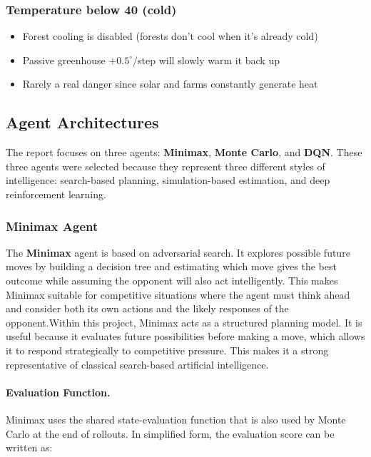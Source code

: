 \documentclass[12pt,a4paper]{article}
\begin{document}
\subsubsection*{Temperature below 40 (cold)}
\begin{itemize}[leftmargin=1.5cm]
    \item Forest cooling is disabled (forests don't cool when it's already cold)
    \item Passive greenhouse $+0.5^\circ$/step will slowly warm it back up
    \item Rarely a real danger since solar and farms constantly generate heat
\end{itemize}

\subsection{Agent Architectures}

The report focuses on three agents: \textbf{Minimax}, \textbf{Monte Carlo}, and \textbf{DQN}. These three agents were selected because they represent three different styles of intelligence: search-based planning, simulation-based estimation, and deep reinforcement learning.

\subsubsection{Minimax Agent}

The \textbf{Minimax} agent is based on adversarial search. It explores possible future moves by building a decision tree and estimating which move gives the best outcome while assuming the opponent will also act intelligently. This makes Minimax suitable for competitive situations where the agent must think ahead and consider both its own actions and the likely responses of the opponent.Within this project, Minimax acts as a structured planning model. It is useful because it evaluates future possibilities before making a move, which allows it to respond strategically to competitive pressure. This makes it a strong representative of classical search-based artificial intelligence.

\paragraph{Evaluation Function.}
Minimax uses the shared state-evaluation function that is also used by Monte Carlo at the end of rollouts. In simplified form, the evaluation score can be written as:
\end{document}
